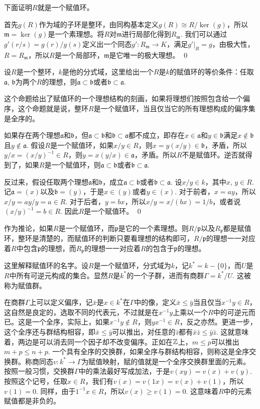 	下面证明$R$就是一个赋值环。

	首先$g(R)$作为域的子环是整环，由同构基本定义$g(R)\cong R/\ker(g)$，所以$\mathfrak{m}=\ker (g)$是一个素理想。将$R$对$\mathfrak{m}$进行局部化得到$R_\mathfrak{m}$. 我们可以通过$g'(r/s)=g(r)/g(s)$定义出一个同态$g':R_\mathfrak{m}\to K$，满足$g'|_R=g$，由极大性，$R=R_\mathfrak{m}$，所以$R$是一个局部环，$\mathfrak{m}$是它唯一的极大理想。\notprove
\qed

\pro 设$R$是一个整环，$k$是他的分式域，这里给出一个$R$是$k$的赋值环的等价条件：任取$\mathfrak{a}$, $\mathfrak{b}$为两个$R$的理想，则$\mathfrak{a}\subset \mathfrak{b}$或者$\mathfrak{b}\subset \mathfrak{a}$. 

这个命题给出了赋值环的一个理想结构的刻画，如果将理想们按照包含给一个偏序，这个命题就是说，整环$R$是一个赋值环，当且仅当它的所有理想构成的偏序集是全序的。

\proof
	如果存在两个理想$\mathfrak{a}$和$\mathfrak{b}$，但$\mathfrak{a}\subset \mathfrak{b}$和$\mathfrak{b}\subset \mathfrak{a}$都不成立，即存在$x\in \mathfrak{a}$和$y\in \mathfrak{b}$满足$x\not\in \mathfrak{b}$且$y\not\in \mathfrak{a}$. 假设$R$是一个赋值环，如果$x/y\in R$，则$x=y(x/y)\in \mathfrak{b}$，矛盾，所以$y/x=(x/y)^{-1}\in R$，则$y=x(y/x)\in\mathfrak{a}$，矛盾。所以$R$不是赋值环。逆否就得到了，如果$R$是一个赋值环，则$\mathfrak{a}\subset \mathfrak{b}$或者$\mathfrak{b}\subset \mathfrak{a}$.

	反过来，假设任取两个理想$\mathfrak{a}$和$\mathfrak{b}$，成立$\mathfrak{a}\subset \mathfrak{b}$或者$\mathfrak{b}\subset \mathfrak{a}$. 设$x/y\in k$，其中$x$, $y\in R$. 记$\mathfrak{a}=(x)$以及$\mathfrak{b}=(y)$，于是$x\in (y)$或者$y\in (x)$. 对于前者，$x=ay$，所以$x/y=ay/y=a\in R$. 对于后者，$y=bx$，所以$x/y=x/(bx)=1/b$，或者说$(x/y)^{-1}=b\in R$. 因此$R$是一个赋值环。
\qed

作为推论，如果$R$是一个赋值环，而$\mathfrak{p}$是它的一个素理想。则$R/\mathfrak{p}$以及$R_{\mathfrak{p}}$都是赋值环，整环是清楚的，而赋值环的判断只要看理想的结构即可，$R/\mathfrak{p}$的理想一一对应着$R$中包含$\mathfrak{p}$的理想，而$R_{\mathfrak{p}}$的理想一一对应着$R$的包含于$\mathfrak{p}$的理想。

\para 这里解释赋值环的名字。设$R$是一个赋值环，分式域为$k$，记$k^*=k-\{0\}$，而$U$是$R$中所有可逆元构成的集合。显然$R$是$k^*$的一个子群，进而有商群$\Gamma=k^*/U$. 这被称为赋值群。

在商群$\Gamma$上可以定义偏序，记$\bar{x}$是$x\in k^*$在$\Gamma$中的像，定义$\bar{x}\leq \bar{y}$当且仅当$x^{-1}y\in R$，这自然是良定的，选取不同的代表元，不过就是在$x^{-1}y$上乘以一个$R$中的可逆元而已。这是一个全序，实际上，如果$x^{-1}y\not\in R$，则$yx^{-1}\in R$，反之亦然。更进一步，这个全序还与群结构相容，即$\bar{x}\leq \bar{y}$可以推出，对任意的$\bar{z}$都有$\bar{x}\bar{z}\leq \bar{y}\bar{z}$. 这就意味着，两边是可以消去同一个因子却不改变偏序。正如在$\mathbb{Z}$上，$m\leq p$可以推出$m+p\leq n+p$. 一个具有全序的交换群，如果全序与群结构相容，则称这是全序交换群。称商同态$v:k^*\to\Gamma$为赋值映射，赋的值就是一个全序交换群里面的元素。按照一般习惯，交换群$\Gamma$中的乘法最好写成加法，于是$v(xy)=v(x)+v(y)$. 按照这个记号，任取$x\in R$，我们有$v(x)=v(1x)=v(x)+v(1)$，所以$v(1)=0$. 同样，由于$1^{-1}x\in R$，所以$v(x)\geq v(1)=0$. 这意味着$R$中的元素赋值都是非负的。

